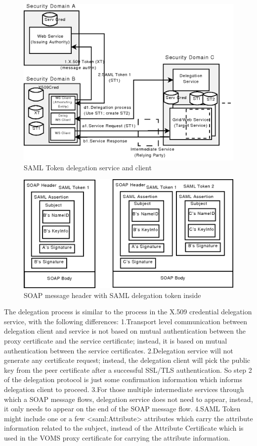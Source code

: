 \documentclass[twocolumn]{svjour3}         %
\begin{document}
\begin{figure}
\includegraphics[width=0.9\columnwidth]{SAMLDelegation.png}
\caption{SAML Token delegation service and client}
\label{fig:SAMLDelegation}
\end{figure}

\begin{figure}
\includegraphics[width=0.9\columnwidth]{SAMLDelegationMessage.png}
\caption{SOAP message header with SAML delegation token inside}
\label{fig:SAMLDelegationMessage}
\end{figure}
The delegation process is similar to the process in the X.509 credential delegation service, with the following differences:
1.Transport level communication between delegation client and service is not based on mutual authentication between the proxy certificate and the service certificate; instead, it is based on mutual authentication between the service certificates.
2.Delegation service will not generate any certificate request; instead, the delegation client will pick the public key from the peer certificate after a successful SSL/TLS authentication. So step 2 of the delegation protocol is just some confirmation information which informs delegation client to proceed.
3.For those multiple intermediate services through which a SOAP message flows, delegation service does not need to appear, instead, it only needs to appear on the end of the SOAP message flow.
4.SAML Token might include one or a few <saml:Attribute> attributes which carry the attribute information related to the subject, instead of the Attribute Certificate which is used in the VOMS proxy certificate for carrying the attribute information.
\end{document}
